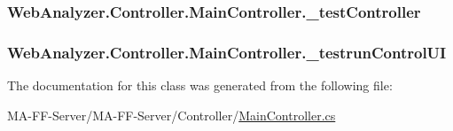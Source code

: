 \subsubsection[{\+\_\+test\+Controller}]{ Web\+Analyzer.\+Controller.\+Main\+Controller.\+\_\+test\+Controller\hspace{0.3cm}{\ttfamily [private]}}\label{class_web_analyzer_1_1_controller_1_1_main_controller_a89f0064ffc8bd59de5df9e610fc765f1}
\hypertarget{class_web_analyzer_1_1_controller_1_1_main_controller_a8acee18d61ec9490f689cf2492c56bc0}{}
\subsubsection[{\+\_\+testrun\+Control\+U\+I}]{ Web\+Analyzer.\+Controller.\+Main\+Controller.\+\_\+testrun\+Control\+U\+I\hspace{0.3cm}{\ttfamily [private]}}\label{class_web_analyzer_1_1_controller_1_1_main_controller_a8acee18d61ec9490f689cf2492c56bc0}


The documentation for this class was generated from the following file\+:\begin{DoxyCompactItemize}
\item 
M\+A-\/\+F\+F-\/\+Server/\+M\+A-\/\+F\+F-\/\+Server/\+Controller/\hyperlink{_main_controller_8cs}{Main\+Controller.\+cs}\end{DoxyCompactItemize}
